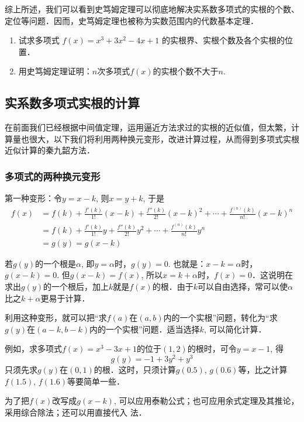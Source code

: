 综上所述，我们可以看到史笃姆定理可以彻底地解决实系数多项式的实根的个数、定位等问题．因而，史笃姆定理也被称为实数范围内的代数基本定理．

\begin{ex}
\begin{enumerate}
    \item 试求多项式 $f(x)=x^3+3x^2-4x+1$ 的实根界、实根个数及各个实根的位置．
    \item 用史笃姆定理证明：$n$次多项式$f(x)$的实根个数不大于$n$.
\end{enumerate}
\end{ex}

\subsection{实系数多项式实根的计算}

在前面我们已经根据中间值定理，运用逼近方法求过的实根的近似值，但太繁，计算量也很大，以下我们将利用两种换元变形，改进计算过程，从而得到多项式实根近似计算的秦九韶方法．

\subsubsection{多项式的两种换元变形}

第一种变形：令$y=x-k$, 则$x=y+k$, 于是
\[\begin{split}
    f(x)&=f(k)+\frac{f'(k)}{1!}(x-k)+\frac{f''(k)}{2!}(x-k)^2+\cdots +\frac{f^{(n)}(k)}{n!}(x-k)^n\\
    &=f(k)+\frac{f'(k)}{1!}y+\frac{f''(k)}{2!}y^2+\cdots +\frac{f^{(n)}(k)}{n!}y^n\\
    &=g(y)=g(x-k)
\end{split}\]

若$g(y)$的一个根是$\alpha$, 即$y=\alpha$时，$g(y)=0$. 也就是：$x-k=\alpha$时，$g(x-k)=0$. 但$g(x-k)=f(x)$, 所以$x=k+\alpha$时，$f(x)=0$．这说明在求出$g(y)$的一个根后，加上$k$就是$f(x)$的根．由于$k$可以自由选择，常可以使$\alpha$比之$k+\alpha$更易于计算．

利用这种变形，就可以把“求$f(a)$在$(a,b)$内的一个实根”问题，转化为“求$g(y)$在$(a-k,b-k)$内的一个实根”问题．适当选择$k$, 可以简化计算．

例如，求多项式$f (x) =x^3-3x+1$的位于$(1, 2)$的根时，可令$y=x-1$, 得
\[g (y) =-1+3y^2+y^3\]
只须先求$g(y)$在$(0, 1)$的根．这时，只须计算$g(0.5)$, $g(0.6)$等，比之计算$f(1. 5)$, $f(1. 6)$等要简单一些．

为了把$f(x)$改写成$g(x-k)$, 可以应用泰勒公式；也可应用余式定理及其推论，采用综合除法；还可以用直接代入
法．

